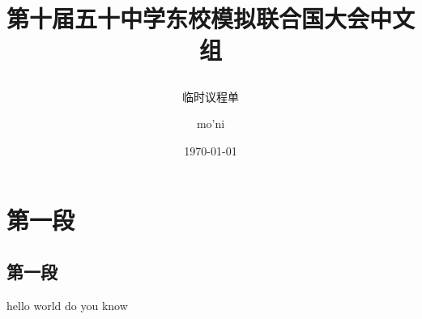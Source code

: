 \documentclass{article}
\title{第十届五十中学东校模拟联合国大会中文组 \\ \subtitle{临时议程单}}
\date{\today}
\author{mo'ni}
\begin{document}
\newpage
\maketitle
\section{第一段}
\subsection{第一段}
hello world do you know
\end{document}
